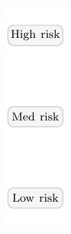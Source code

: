 
\usepackage{graphicx,tikz}
\usetikzlibrary{arrows.meta}
\graphicspath{{../../paper/sit/figs/flows/}{../flows/}}

  \begin{minipage}[t]{1cm}\vspace{0pt}
    \includegraphics[width=\linewidth]{flows-labels.pdf}%
  \end{minipage}%
